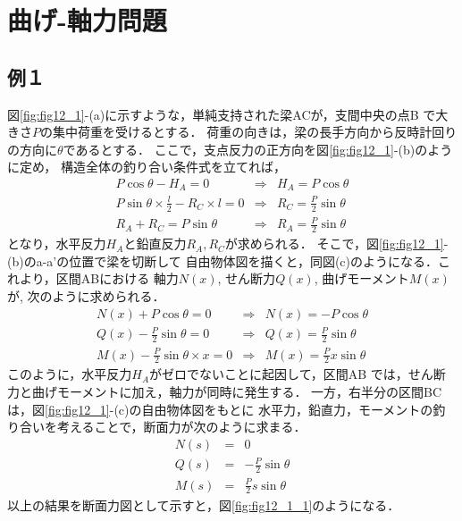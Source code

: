\documentclass[10pt,a4j]{jarticle}
\begin{document}
\section{曲げ-軸力問題}
\subsection{例１}
図\ref{fig:fig12_1}-(a)に示すような，単純支持された梁ACが，支間中央の点B
で大きさ$P$の集中荷重を受けるとする．
荷重の向きは，梁の長手方向から反時計回りの方向に$\theta$であるとする．
ここで，支点反力の正方向を図\ref{fig:fig12_1}-(b)のように定め，
構造全体の釣り合い条件式を立てれば，
\begin{eqnarray}
	P\cos\theta-H_A=0 & \Rightarrow & H_A=P\cos\theta \\
	P\sin\theta \times \frac{l}{2}-R_C\times l =0 & \Rightarrow & R_C=\frac{P}{2}\sin\theta \\
	R_A+R_C=P\sin\theta & \Rightarrow & R_A=\frac{P}{2}\sin\theta
\end{eqnarray}
となり，水平反力$H_A$と鉛直反力$R_A,R_C$が求められる．
そこで，図\ref{fig:fig12_1}-(b)のa-a'の位置で梁を切断して
自由物体図を描くと，同図(c)のようになる．これより，区間ABにおける
軸力$N(x)$, せん断力$Q(x)$, 曲げモーメント$M(x)$が, 次のように求められる．
\begin{eqnarray}
	N(x)+P\cos\theta=0 & \Rightarrow & N(x)=-P\cos\theta \\
	Q(x)-\frac{P}{2}\sin\theta=0 & \Rightarrow & Q(x)=\frac{P}{2}\sin\theta \\
	M(x)-\frac{P}{2}\sin\theta\times x =0 & \Rightarrow & M(x)=\frac{P}{2}x\sin\theta
\end{eqnarray}
このように，水平反力$H_A$がゼロでないことに起因して，区間AB
では，せん断力と曲げモーメントに加え，軸力が同時に発生する．
一方，右半分の区間BCは，図\ref{fig:fig12_1}-(c)の自由物体図をもとに
水平力，鉛直力，モーメントの釣り合いを考えることで，断面力が次のように求まる．
\begin{eqnarray}
	N(s)&=& 0 \\
	Q(s)&=&-\frac{P}{2}\sin\theta \\
	M(s)&=&\frac{P}{2}s \sin\theta
\end{eqnarray}
以上の結果を断面力図として示すと，図\ref{fig:fig12_1_1}のようになる．
\end{document}
